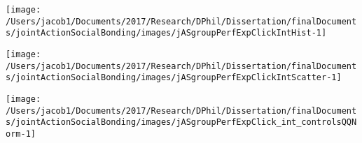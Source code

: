 \documentclass[english]{article}\usepackage[]{graphicx}\usepackage[]{color}
\makeatletter
\def\maxwidth{ %
  \ifdim\Gin@nat@width>\linewidth
    \linewidth
  \else
    \Gin@nat@width
  \fi
}
\newenvironment{knitrout}{}{} %
\makeatother
\begin{document}
\begin{knitrout}
\color{fgcolor}

{\centering \texttt{[image: /Users/jacob1/Documents/2017/Research/DPhil/Dissertation/finalDocuments/jointActionSocialBonding/images/jASgroupPerfExpClickIntHist-1]} 

}



\end{knitrout}
\begin{knitrout}
\color{fgcolor}

{\centering \texttt{[image: /Users/jacob1/Documents/2017/Research/DPhil/Dissertation/finalDocuments/jointActionSocialBonding/images/jASgroupPerfExpClickIntScatter-1]} 

}



\end{knitrout}
\begin{knitrout}
\color{fgcolor}

{\centering \texttt{[image: /Users/jacob1/Documents/2017/Research/DPhil/Dissertation/finalDocuments/jointActionSocialBonding/images/jASgroupPerfExpClick\_int\_controlsQQNorm-1]} 

}



\end{knitrout}
\end{document}

